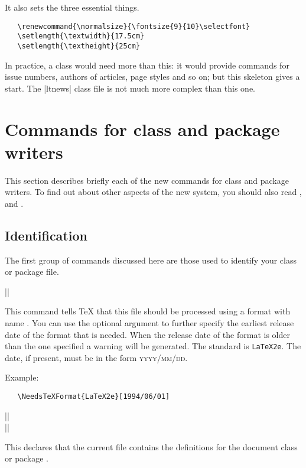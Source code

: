 \documentclass{ltxguide}[1995/11/28]
\begin{document}
It also sets the three essential things.
\begin{verbatim}
   \renewcommand{\normalsize}{\fontsize{9}{10}\selectfont}
   \setlength{\textwidth}{17.5cm}
   \setlength{\textheight}{25cm}
\end{verbatim}
In practice, a class would need more than this: it would provide
commands for issue numbers, authors of articles, page styles and so
on; but this skeleton gives a start.  The |ltnews| class file is not
much more complex than this one.

\section{Commands for class and package writers}
\label{Sec:commands}

This section describes briefly each of the new commands for class and
package writers.  To find out about other aspects of the new system,
you should also read \emph{\LaTeXbook}, \emph{\LaTeXcomp} and
\emph{\usrguide}.

\subsection{Identification}

The first group of commands discussed here are those used
to identify your class or package file.

\begin{decl}
|\NeedsTeXFormat|  
\end{decl}
This command tells \TeX{} that this file should be processed using a
format with name .  You can use the optional argument
 to further specify the earliest release date of the
format that is needed.  When the release date of the format is older
than the one specified a warning will be generated. The standard
 is \texttt{LaTeX2e}.  The date, if present, must be in
the form \textsc{yyyy/mm/dd}.

Example:
\begin{verbatim}
   \NeedsTeXFormat{LaTeX2e}[1994/06/01]
\end{verbatim}

\begin{decl}
|\ProvidesClass|   \\
|\ProvidesPackage|  
\end{decl}
This declares that the current file contains the definitions for the
document class  or package .
\end{document}

